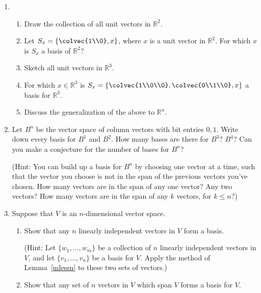 


\begin{enumerate}
\item \begin{enumerate}
\item Draw the collection of all unit vectors in $\mathbb{R}^2$. 
\item  Let $S_x=\left\{ \colvec{1\\0}, x \right\}$, where $x$ is a unit vector in $\mathbb{R}^2$.  For which $x$ is $S_x$ a basis of $\mathbb{R}^2$?
\item Sketch all unit vectors in $\mathbb{R}^3$.
\item For which $x\in \mathbb{R}^3$ is $S_x=\left\{ \colvec{1\\0\\0},\colvec{0\\1\\0}, x \right\}$ a basis for $\mathbb{R}^3$.  
\item Discuss the generalization of the above to $\mathbb{R}^n$.
\end{enumerate}


\item \label{prob_bit_matrices_basis} Let $B^n$ be the vector space of column vectors with bit entries $0, 1$.  Write down every basis for $B^1$ and $B^2$.  How many bases are there for $B^3$? $B^4$?  Can you make a conjecture for the number of bases for $B^n$?

(Hint: You can build up a basis for $B^n$ by choosing one vector at a time, such that the vector you choose is not in the span of the previous vectors you've chosen.  How many vectors are in the span of any one vector?  Any two vectors?  How many vectors are in the span of any $k$ vectors, 
for $k\leq n$?)



\item \label{lotsofbases} Suppose that \(V\) is an \(n\)-dimensional vector space.
\begin{enumerate}
\item Show that any \(n\) linearly independent vectors in \(V\) form a basis.

(Hint: Let \(\{w_1, \ldots, w_m\}\) be a collection of \(n\) linearly independent vectors in \(V\), and let \(\{v_1, \ldots, v_n\}\) be a basis for \(V\). Apply the method of Lemma~\ref{mlessn} to these two sets of vectors.)
\item Show that any set of \(n\) vectors in \(V\) which span \(V\) forms a basis for \(V\).


\end{enumerate}
\end{enumerate}
